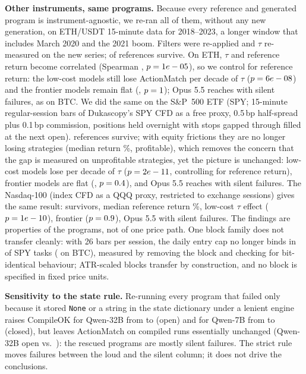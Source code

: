 \documentclass[sigconf,anonymous,review]{acmart}
\begin{document}
\textbf{Other instruments, same programs.} Because every reference and generated program is
instrument-agnostic, we re-ran all of them, without any new generation, on ETH/USDT 15-minute data
for 2018--2023, a longer window that includes March 2020 and the 2021 boom. Filters were re-applied and
$\tau$ re-measured on the new series; \MAEthSurvive{} of \NTasks{} references survive. On ETH, $\tau$
and reference return become correlated (Spearman \MAEthRho, $p=1e-05$), so we control for
reference return: the low-cost models still lose \MAEthLowTau{} ActionMatch per decade of $\tau$
($p=6e-08$) and the frontier models remain flat (\MAEthFrontTau, $p=1$); Opus
5.5 reaches \MAEthAMOpus{} with \MAEthSilentOpus{} silent failures, as on BTC. We did the same on
the S\&P~500 ETF (SPY; 15-minute regular-session bars of Dukascopy's SPY CFD as a free proxy, 0.5\,bp
half-spread plus 0.1\,bp commission, positions held overnight with stops gapped through filled at the
next open). \MASpySurvive{} references survive; with equity frictions they are no longer losing
strategies (median return \MASpyRMed\%, \MASpyProfitable{} profitable), which removes the concern that
the gap is measured on unprofitable strategies, yet the picture is unchanged: low-cost models lose
\MASpyLowTau{} per decade of $\tau$ ($p=2e-11$, controlling for reference return), frontier
models are flat (\MASpyFrontTau, $p=0.4$), and Opus 5.5 reaches \MASpyAMOpus{} with
\MASpySilentOpus{} silent failures. The Nasdaq-100 (index CFD as a QQQ proxy, restricted to exchange sessions) gives
the same result: \MANdxSurvive{} survivors, median reference return \MANdxRMed\%, low-cost $\tau$
effect \MANdxLowTau{} ($p=1e-10$), frontier \MANdxFrontTau{} ($p=0.9$), Opus 5.5
\MANdxAMOpus{} with \MANdxSilentOpus{} silent failures. The findings are properties of the programs, not of one price
path. One block family does not transfer cleanly: with 26 bars per session, the daily entry cap no
longer binds in \MASpyInertDailyCap{} of SPY tasks (\MABtcInertDailyCap{} on BTC), measured by
removing the block and checking for bit-identical behaviour; ATR-scaled blocks transfer by
construction, and no block is specified in fixed price units.

\textbf{Sensitivity to the state rule.} Re-running every program that failed only because it stored
\texttt{None} or a string in the state dictionary under a lenient engine raises CompileOK for
Qwen-32B from \CompileOKQwenLOpen{} to \CompileLenientQwenLOpen{} (open) and for Qwen-7B from
\CompileOKQwenSClosed{} to \CompileLenientQwenSClosed{} (closed), but leaves ActionMatch on compiled
runs essentially unchanged (Qwen-32B open \ActionMatchQwenLOpen{} vs.\ \AMLenientQwenLOpen): the
rescued programs are mostly silent failures. The strict rule moves failures between the loud and
the silent column; it does not drive the conclusions.
\end{document}
